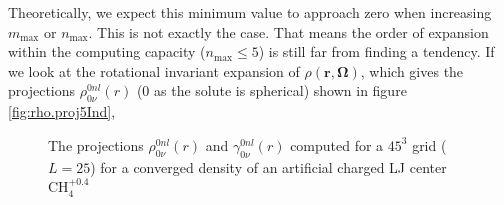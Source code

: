 Theoretically, we expect this minimum value to approach zero when
increasing $m_{\max}$ or $n_{\max}$. This is not exactly the case.
That means the order of expansion within the computing capacity ($n_{\max}\leq5$)
is still far from finding a tendency. If we look at the rotational
invariant expansion of $\rho(\mathbf{r},\mathbf{\Omega})$, which
gives the projections $\rho_{0\nu}^{0nl}(r)$ (0 as the solute is spherical) shown in figure \ref{fig:rho.proj5Ind},
\begin{figure}[h]
\begin{centering}
\par\end{centering}
\begin{centering}
\par\end{centering}
\caption[$\rho_{0\nu}^{0nl}(r)$ and $\gamma_{0\nu}^{0nl}(r)$ of an artificial
charged LJ center $\mathrm{CH}_{4}^{+0.4}$]{The projections $\rho_{0\nu}^{0nl}(r)$ and $\gamma_{0\nu}^{0nl}(r)$
computed for a $45^{3}$ grid ($L=25$) for a converged density of
an artificial charged LJ center $\mathrm{CH}_{4}^{+0.4}$}
\end{figure}
